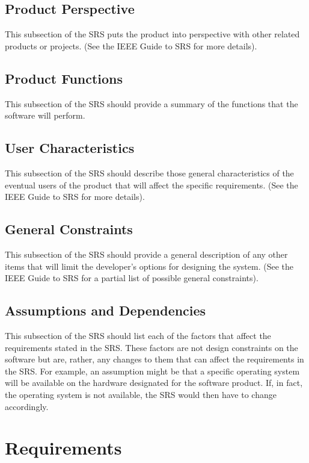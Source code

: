 \documentclass{scrreprt}
\begin{document}
	\section{Product Perspective}

This subsection of the SRS puts the product into perspective with other related products or
projects.  (See the IEEE Guide to SRS for more details).

	\section{Product Functions}

This subsection of the SRS should provide a summary of the functions that the software will perform. 

	\section{User Characteristics}

This subsection of the SRS should describe those general characteristics of the eventual users of the product that will affect the specific requirements.  (See the IEEE Guide to SRS for more details).

	\section{General Constraints}

This subsection of the SRS should provide a general description of any other items that will
limit the developer’s options for designing the system. (See the IEEE Guide to SRS for a partial list of possible general constraints).

	\section{Assumptions and Dependencies}

This subsection of the SRS should list each of the factors that affect the requirements stated in the SRS. These factors are not design constraints on the software but are, rather, any changes to them that can affect the requirements in the SRS. For example, an assumption might be that a specific operating system will be available on the hardware designated for the software product. If, in fact, the operating system is not available, the SRS would then have to change accordingly.

\chapter{Requirements}	
\end{document}
